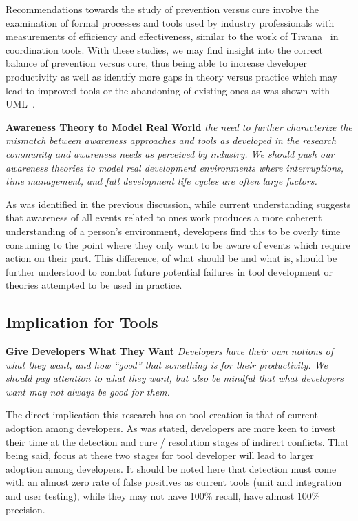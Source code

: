 \documentclass[conference]{IEEEtran}
\begin{document}
Recommendations towards the study of prevention versus cure involve the examination of formal processes and tools used
by industry professionals with measurements of efficiency and effectiveness, similar to the work of
Tiwana~\cite{Tiwana:2008:ICD} in coordination tools. With these studies, we may find insight into the correct balance
of prevention versus cure, thus being able to increase developer productivity as well as identify more gaps in theory 
versus practice which may lead to improved tools or the abandoning of existing ones as was shown with UML~\cite{Petre:2013:UP}.

\textbf{Awareness Theory to Model Real World} \textit{the need to further characterize the
mismatch between awareness approaches and tools as developed in the research community and awareness needs as perceived
by industry. We should push our awareness theories to model real development
environments where interruptions, time management, and full development life cycles are often large factors.}

As was identified in the previous discussion, while current understanding suggests that awareness of all events related to ones work
produces a more coherent understanding of a person's environment, developers find this to be overly time consuming
to the point where they only want to be aware of events which require action on their part. This difference, of what 
should be and what is, should be further understood to combat future potential failures in
tool development or theories attempted to be used in practice.

\subsection{Implication for Tools}
\label{sec:implt}

\textbf{Give Developers What They Want} \textit{Developers have their own notions of what they want, and how ``good''
that something is for their productivity. We should pay attention to what they want, but also be mindful that what
developers want may not always be good for them.}

The direct implication this research has on tool creation is that of current adoption among developers. As was stated,
developers are more keen to invest their time at the detection and cure / resolution stages of indirect conflicts. That being 
said, focus at these two stages for tool developer will lead to larger adoption among developers.
It should be noted here that detection must come with an almost zero rate of false positives as
current tools (unit and integration and user testing), while they may not have 100\% recall, have almost 100\% precision.
\end{document}
